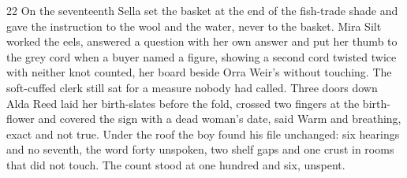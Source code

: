 \begin{CRchronicle}{22}
On the seventeenth Sella set the basket at the end of the fish-trade shade and gave the instruction to the wool and the water, never to the basket. Mira Silt worked the eels, answered a question with her own answer and put her thumb to the grey cord when a buyer named a figure, showing a second cord twisted twice with neither knot counted, her board beside Orra Weir’s without touching. The soft-cuffed clerk still sat for a measure nobody had called. Three doors down Alda Reed laid her birth-slates before the fold, crossed two fingers at the birth-flower and covered the sign with a dead woman’s date, said Warm and breathing, exact and not true. Under the roof the boy found his file unchanged: six hearings and no seventh, the word forty unspoken, two shelf gaps and one crust in rooms that did not touch. The count stood at one hundred and six, unspent.
\end{CRchronicle}
